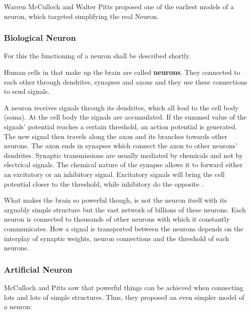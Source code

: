 Warren McCulloch and Walter Pitts proposed one of the earliest models of a neuron, which targeted simplifying the real Neuron.

\subsubsection{Biological Neuron}
For this the functioning of a neuron shall be described shortly.

Human cells in that make up the brain are called \textbf{neurons}.
They connected to each other through dendrites, synapses and axons and they use these connections to send signals.

A neuron receives signals through its dendrites, which all lead to the cell body (soma).
At the cell body the signals are accumulated.
If the summed value of the signals' potential reaches a certain threshold, an action potential is generated.
The new signal then travels along the axon and its branches towards other neurons.
The axon ends in synapses which connect the axon to other neurons' dendrites.
Synaptic transmissions are usually mediated by chemicals and not by electrical signals.
The chemical nature of the synapse allows it to forward either an excitatory or an inhibitory signal.
Excitatory signals will bring the cell potential closer to the threshold, while inhibitory do the opposite \cite[p.~42]{coloratlas}.

What makes the brain so powerful though, is not the neuron itself with its arguably simple structure but the vast network of billions of these neurons.
Each neuron is connected to thousands of other neurons with which it constantly communicates.
How a signal is transported between the neurons depends on the interplay of synaptic weights, neuron connections and the threshold of each neurons.

\subsubsection{Artificial Neuron}
McCulloch and Pitts saw that powerful things can be achieved when connecting lots and lots of simple structures.
Thus, they proposed an even simpler model of a neuron:

